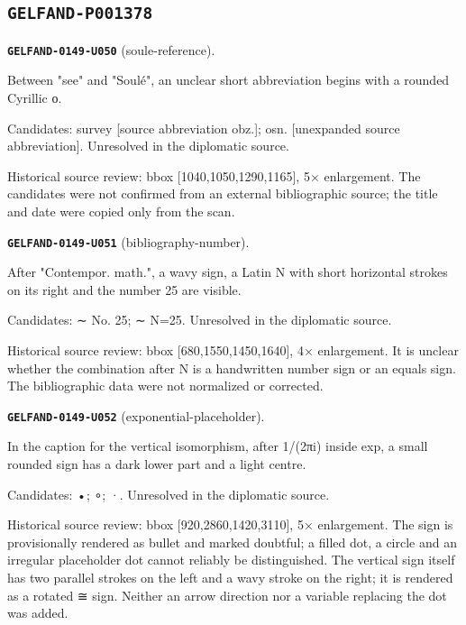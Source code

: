 \documentclass[11pt]{article}
\theoremstyle{definition}
\theoremstyle{remark}
\begin{document}
\subsection*{\texttt{GELFAND-P001378}}
\noindent\leavevmode{}\label{GELFAND-P001378:soule-reference:note}\textbf{\texttt{GELFAND-0149-U050}} (soule-reference).\par\nopagebreak[4]
Between "see" and "Soulé", an unclear short abbreviation begins with a rounded Cyrillic о.\par
Candidates: survey [source abbreviation obz.]; osn. [unexpanded source abbreviation]. Unresolved in the diplomatic source.\par
Historical source review: bbox [1040,1050,1290,1165], 5× enlargement. The candidates were not confirmed from an external bibliographic source; the title and date were copied only from the scan.\par\medskip
\noindent\leavevmode{}\label{GELFAND-P001378:bibliography-number:note}\textbf{\texttt{GELFAND-0149-U051}} (bibliography-number).\par\nopagebreak[4]
After "Contempor. math.", a wavy sign, a Latin N with short horizontal strokes on its right and the number 25 are visible.\par
Candidates: ∼ No. 25; ∼ N=25. Unresolved in the diplomatic source.\par
Historical source review: bbox [680,1550,1450,1640], 4× enlargement. It is unclear whether the combination after N is a handwritten number sign or an equals sign. The bibliographic data were not normalized or corrected.\par\medskip
\noindent\leavevmode{}\label{GELFAND-P001378:exponential-placeholder:note}\textbf{\texttt{GELFAND-0149-U052}} (exponential-placeholder).\par\nopagebreak[4]
In the caption for the vertical isomorphism, after 1/(2πi) inside exp, a small rounded sign has a dark lower part and a light centre.\par
Candidates: •; ∘; ·. Unresolved in the diplomatic source.\par
Historical source review: bbox [920,2860,1420,3110], 5× enlargement. The sign is provisionally rendered as bullet and marked doubtful; a filled dot, a circle and an irregular placeholder dot cannot reliably be distinguished. The vertical sign itself has two parallel strokes on the left and a wavy stroke on the right; it is rendered as a rotated ≅ sign. Neither an arrow direction nor a variable replacing the dot was added.\par\medskip
\end{document}
